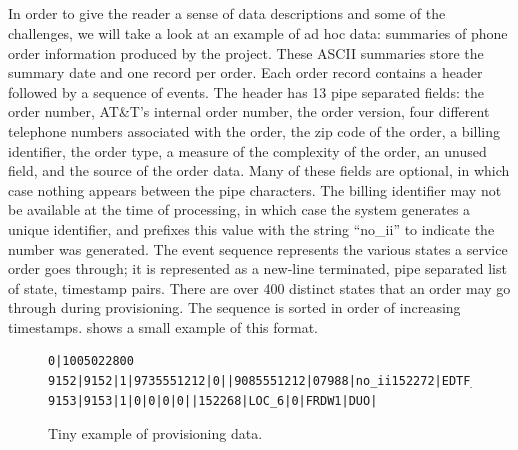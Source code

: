 \documentclass{entcs}
\begin{document}
\subsection{\dibbler{}}
In order
to give the reader a sense of data descriptions
and some of the challenges, we will take a look at an example of ad
hoc data: summaries of phone order information produced by the
\dibbler{} project.
These ASCII summaries store the summary date and one record per order.
Each order record contains a header followed by a sequence of events.
The header has 13 pipe separated fields: the order number, AT\&T's
internal order number, the order version, four different telephone
numbers associated with the order, the zip code of the order, a
billing identifier, the order type, a measure of the complexity of the
order, an unused field, and the source of the order data.  Many of
these fields are optional, in which case nothing appears between the
pipe characters.  The billing identifier may not be available at the
time of processing, in which case the system generates a unique
identifier, and prefixes this value with the string ``no\_ii'' to
indicate the number was generated. The event sequence represents the
various states a service order goes through; it is represented as a
new-line terminated, pipe separated list of state, timestamp pairs.
There are over 400 distinct states that an order may go through during
provisioning.  The sequence is sorted in order of increasing timestamps. 
 shows a small example of
this format.


\begin{figure}
\begin{small}
\begin{verbatim}
0|1005022800
9152|9152|1|9735551212|0||9085551212|07988|no_ii152272|EDTF_6|0|APRL1|DUO|
9153|9153|1|0|0|0|0||152268|LOC_6|0|FRDW1|DUO|
\end{verbatim}
\caption{Tiny example of \dibbler{} provisioning data.}
\label{figure:dibbler-records}
\end{small}
\end{figure}
\end{document}

